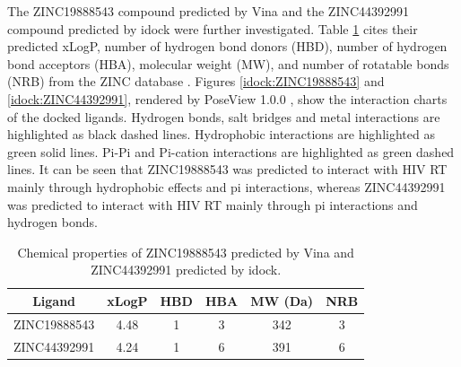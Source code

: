 The ZINC19888543 compound predicted by Vina and the ZINC44392991 compound predicted by idock were further investigated. Table \ref{idock:ZINC19888543-ZINC44392991} cites their predicted xLogP, number of hydrogen bond donors (HBD), number of hydrogen bond acceptors (HBA), molecular weight (MW), and number of rotatable bonds (NRB) from the ZINC database \citep{532,1178}. Figures \ref{idock:ZINC19888543} and \ref{idock:ZINC44392991}, rendered by PoseView 1.0.0 \citep{748}, show the interaction charts of the docked ligands. Hydrogen bonds, salt bridges and metal interactions are highlighted as black dashed lines. Hydrophobic interactions are highlighted as green solid lines. Pi-Pi and Pi-cation interactions are highlighted as green dashed lines. It can be seen that ZINC19888543 was predicted to interact with HIV RT mainly through hydrophobic effects and pi interactions, whereas ZINC44392991 was predicted to interact with HIV RT mainly through pi interactions and hydrogen bonds.

\begin{table}
\centering
\begin{tabular*}
{\linewidth}
{@{\extracolsep{\fill}}cccccc}
\toprule
Ligand & xLogP & HBD & HBA & MW (Da) & NRB\\
\midrule
ZINC19888543 & 4.48 & 1 & 3 & 342 & 3\\
ZINC44392991 & 4.24 & 1 & 6 & 391 & 6\\
\bottomrule
\end{tabular*}
\caption{Chemical properties of ZINC19888543 predicted by Vina and ZINC44392991 predicted by idock.}
\label{idock:ZINC19888543-ZINC44392991}
\end{table}

